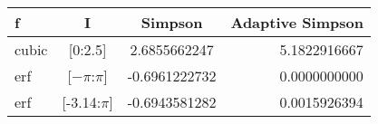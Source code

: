 
\begin{table}[H]
    \centering
    \begin{tabular}{lccr}
    \hline
    
        \textbf{ f }
        
           &
        
    
        \textbf{ I }
        
           &
        
    
        \textbf{ Simpson }
        
           &
        
    
        \textbf{ Adaptive Simpson }
        
     
    \\
    \hline
    
        
            cubic
             
               &
            
        
            [0:2.5]
             
               &
            
        
            2.6855662247
             
               &
            
        
            5.1822916667
            
        
        \\
    
        
            erf
             
               &
            
        
            [$-\pi$:$\pi$]
             
               &
            
        
            -0.6961222732
             
               &
            
        
            0.0000000000
            
        
        \\
    
        
            erf
             
               &
            
        
            [-3.14:$\pi$]
             
               &
            
        
            -0.6943581282
             
               &
            
        
            0.0015926394
            

\end{tabular}
\end{table}
